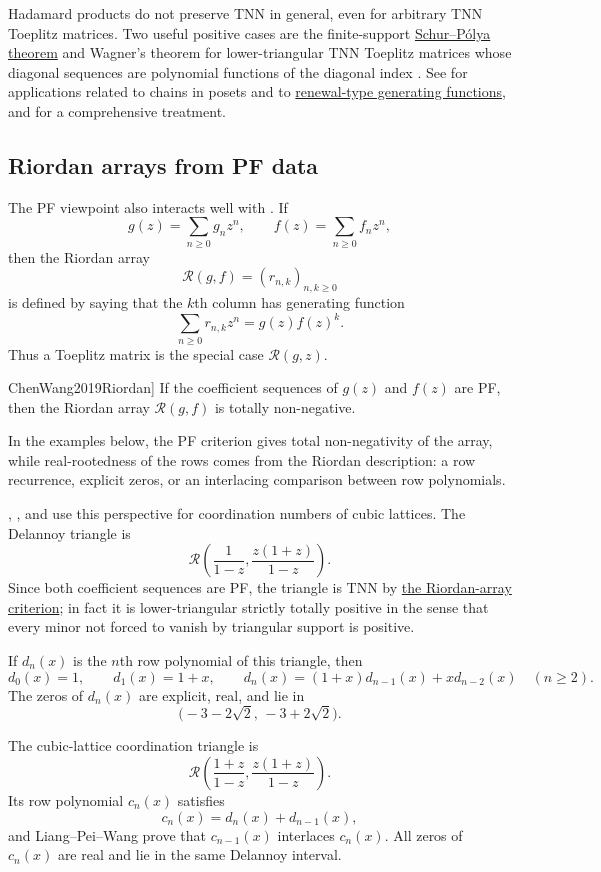 Hadamard products do not preserve TNN in general, even for arbitrary TNN
Toeplitz matrices.  Two useful positive cases are the finite-support
\hyperref[hadamardProductTheorems]{Schur--Pólya theorem} and Wagner's theorem
for lower-triangular TNN Toeplitz matrices whose diagonal sequences are
polynomial functions of the diagonal index \cite{Wagner1992}.
See \cite{BrandenLeite2024x} for applications related to chains in posets
and to \hyperref[brandenLeiteRenewal]{renewal-type generating functions},
and \cite{FallatJohnson2011} for a comprehensive treatment.

\subsection[pfRiordanArrays]{Riordan arrays from PF data}

The PF viewpoint also interacts well with
\label{riordanArrayPF}.  If
\[
  g(z)=\sum_{n\geq 0}g_nz^n,\qquad
  f(z)=\sum_{n\geq 0}f_nz^n,
\]
then the Riordan array
\[
  \mathcal R(g,f)=(r_{n,k})_{n,k\geq 0}
\]
is defined by saying that the \(k\)th column has generating function
\[
  \sum_{n\geq 0} r_{n,k}z^n=g(z)f(z)^k.
\]
Thus a Toeplitz matrix is the special case \(\mathcal R(g,z)\).

\begin{theorem}[Chen--Wang, \cite[Thm.~2.1]{ChenWang2019Riordan}]
\label{pfRiordanArrayCriterion}
If the coefficient sequences of \(g(z)\) and \(f(z)\) are PF, then the
Riordan array \(\mathcal R(g,f)\) is totally non-negative.
\end{theorem}

In the examples below, the PF criterion gives total non-negativity of the
array, while real-rootedness of the rows comes from the Riordan description:
a row recurrence, explicit zeros, or an interlacing comparison between row
polynomials.

\begin{example*}
, , and 
\cite{LiangPeiWang2023Coordination} use this perspective for coordination
numbers of cubic lattices.  The Delannoy triangle is
\[
  \mathcal R\left(\frac{1}{1-z},\frac{z(1+z)}{1-z}\right).
\]
Since both coefficient sequences are PF, the triangle is TNN by
\hyperref[pfRiordanArrayCriterion]{the Riordan-array criterion}; in fact it
is lower-triangular strictly totally positive in the sense that every minor
not forced to vanish by triangular support is positive.

If \(d_n(x)\) is the \(n\)th row polynomial of this triangle, then
\[
  d_0(x)=1,\qquad d_1(x)=1+x,\qquad
  d_n(x)=(1+x)d_{n-1}(x)+x d_{n-2}(x)\quad(n\geq 2).
\]
The zeros of \(d_n(x)\) are explicit, real, and lie in
\[
  \bigl(-3-2\sqrt{2},\,-3+2\sqrt{2}\bigr).
\]

The cubic-lattice coordination triangle  is
\[
  \mathcal R\left(\frac{1+z}{1-z},\frac{z(1+z)}{1-z}\right).
\]
Its row polynomial \(c_n(x)\) satisfies
\[
  c_n(x)=d_n(x)+d_{n-1}(x),
\]
and Liang--Pei--Wang prove that \(c_{n-1}(x)\) interlaces \(c_n(x)\).
All zeros of \(c_n(x)\) are real and lie in the same Delannoy interval.
\end{example*}

